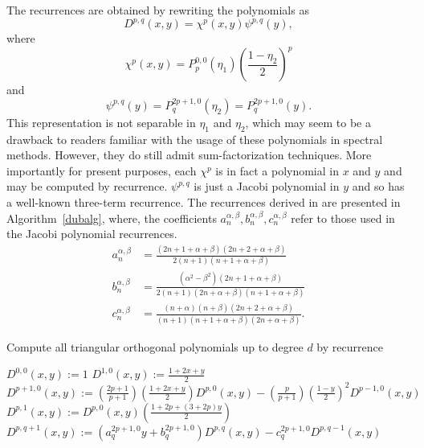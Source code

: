 The recurrences are obtained by rewriting the polynomials as
\[
D^{p,q}(x,y) = \chi^{p}(x,y) \psi^{p,q}(y),
\]
where \[
 \chi^{p}(x,y) = P^{0,0}_p(\eta_1) \left( \frac{1-\eta_2}{2}
\right)^p
\]
and
\[
\psi^{p,q}(y) = P^{2p+1,0}_q(\eta_2) = P^{2p+1,0}_q(y).
\]
This representation is not separable in \( \eta_1 \) and \( \eta_2
\), which may seem to be a drawback to readers familiar with the
usage of these polynomials in spectral methods.  However, they do
still admit sum-factorization techniques.  More importantly for
present purposes, each \( \chi^p \) is in fact a polynomial in \(
x \) and \( y \) and may be computed by recurrence.  \( \psi^{p,q}
\) is just a Jacobi polynomial in \( y \) and so has a well-known
three-term recurrence.  The recurrences derived in \citet{Kirby2009}
are presented in Algorithm~\ref{dubalg}, where, the coefficients \(
a_n^{\alpha,\beta},b_n^{\alpha,\beta},c_n^{\alpha,\beta} \) refer to
those used in the Jacobi polynomial recurrences.
\begin{equation}
\label{eq:recurcoeff}
\begin{split}
a^{\alpha,\beta}_n
  & = \frac{(2n + 1 + \alpha + \beta)(2n + 2 + \alpha + \beta)}
             {2(n+1)(n+1+\alpha+\beta)}
\\
b^{\alpha,\beta}_n
  & = \frac{(\alpha^2 -\beta^2)(2n+1+\alpha+\beta)}
             {2(n+1)(2n+\alpha+\beta)(n+1+\alpha+\beta)}\\
c^{\alpha,\beta}_n & = \frac{(n+\alpha)(n+\beta)(2n+2+\alpha+\beta)}
             {(n+1)(n+1+\alpha+\beta)(2n+\alpha+\beta)}.
\end{split}
\end{equation}
\begin{algorithm}
\caption{Compute all triangular orthogonal polynomials up to degree
  $d$ by recurrence}
\label{dubalg}
\begin{algorithmic}[1]
\State $D^{0,0}(x,y) := 1$
\State $D^{1,0}(x,y) := \frac{1+2x+y}{2}$
\State $D^{p+1,0}(x,y) := \left( \frac{2p+1}{p+1} \right)
\left( \frac{1 + 2x + y}{2} \right) D^{p,0}(x,y)
- \left( \frac{p}{p+1} \right) \left( \frac{1-y}{2} \right)^2
D^{p-1,0}(x,y)$
\EndFor
{}
\State $D^{p,1}(x,y) := D^{p,0}(x,y) \left( \frac{1+2p+(3+2p) y}{2} \right)$
\EndFor
{}
\State $D^{p,q+1}(x,y) :=
\left( a_{q}^{2p+1,0} y + b_q^{2p+1,0} \right) D^{p,q}(x,y)
- c_q^{2p+1,0} D^{p,q-1}(x,y)$
\EndFor
\EndFor
\end{algorithmic}
\end{algorithm}

